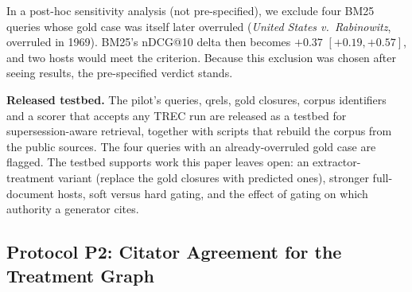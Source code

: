 In a post-hoc sensitivity analysis (not pre-specified), we exclude four BM25 queries whose gold case was itself later overruled (\emph{United States v.\ Rabinowitz}, overruled in 1969). BM25's nDCG@10 delta then becomes $+0.37$ $[+0.19,+0.57]$, and two hosts would meet the criterion. Because this exclusion was chosen after seeing results, the pre-specified verdict stands.

\textbf{Released testbed.} The pilot's queries, qrels, gold closures, corpus identifiers and a scorer that accepts any TREC run are released as a testbed for supersession-aware retrieval, together with scripts that rebuild the corpus from the public sources. The four queries with an already-overruled gold case are flagged. The testbed supports work this paper leaves open: an extractor-treatment variant (replace the gold closures with predicted ones), stronger full-document hosts, soft versus hard gating, and the effect of gating on which authority a generator cites.

\begin{table}[t]
\centering
\caption{P1 pilot, gold-treatment variant: indicator gate vs.\ ungated host on post-closure queries of full overrulings ($n\!=\!984$, 208 pair clusters). \emph{Stale@10}: queries with the overruled case in the top~10 (ungated). $\Delta$: gated $-$ ungated with 95\% cluster-bootstrap CIs (10{,}000 resamples); $^{*}$Holm-adjusted $p\!<\!0.05$ across hosts. \emph{Ctrl}: $\Delta$nDCG@10 lower bound on control queries (non-inferiority margin $-0.5$).}
\label{tab:p1_pilot}
\small
\setlength{\tabcolsep}{3pt}
\end{table}

\subsection{Protocol P2: Citator Agreement for the Treatment Graph}
\label{app:p2}

